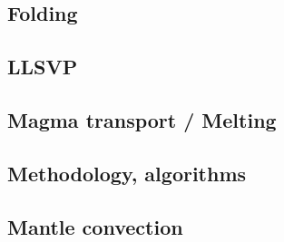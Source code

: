\subsection*{Folding}

\cite{ramb68}
\cite{ramb70}
\cite{ramb71}
\cite{reds12}
\cite{regc13}

\subsection*{LLSVP}

\cite{limc13}

\subsection*{Magma transport / Melting}

\cite{yatd12}
\cite{lorg18}

\subsection*{Methodology, algorithms}

\cite{leka93}

\subsection*{Mantle convection}

\cite{hemw75}
\cite{ludt79}
\cite{olco80}\cite{jamc80}
\cite{jape82}\cite{homc82}
\cite{hous83}\cite{hous83b}
\cite{olyb84}\cite{jarv84}\cite{haeb84}\cite{harp84}\cite{davi84}
\cite{jarv85}
\cite{davi86}
\cite{yuqh87}
\cite{zhch93}\cite{jarv93}\cite{tack93}
\cite{haeb94}
\cite{zhgu95}
\cite{zhyu96}\cite{hond96}\cite{rytr96a}\cite{rytr96b}\cite{tack96}\cite{trbo96}
\cite{hond97}\cite{iwho97}
\cite{ande98}\cite{iwho98}\cite{devv98}\cite{tack98}\cite{tack98b}\cite{trha98b}\cite{trha98}
\cite{duyr99}
\cite{albe00}\cite{hayu00}\cite{devv00b}\cite{tack00b}\cite{zhzm00}
\cite{tasu02}
\cite{hapa03}
\cite{taxn05}
\cite{nake07}
\cite{tack08}
\cite{wodd09}
\cite{lowm11}\cite{rota11}\cite{woda11}
\cite{holj13}\cite{dadb13}\cite{toyd13}
\cite{arfw14}\cite{helo14}
\cite{thkp15}


